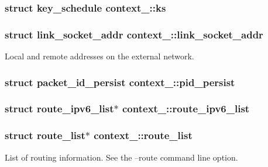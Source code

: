 \subsubsection[{ks}]{\setlength{\rightskip}{0pt plus 5cm}struct {\bf key\+\_\+schedule} context\+\_\+::ks}\label{structcontext__1_a2add75182e7da9d1d466d37c72e1c276}
\hypertarget{structcontext__1_a3f08fbd0447517dc9fefa3e1a30fa26f}{}
\subsubsection[{link\+\_\+socket\+\_\+addr}]{\setlength{\rightskip}{0pt plus 5cm}struct {\bf link\+\_\+socket\+\_\+addr} context\+\_\+::link\+\_\+socket\+\_\+addr}\label{structcontext__1_a3f08fbd0447517dc9fefa3e1a30fa26f}
Local and remote addresses on the external network. \hypertarget{structcontext__1_aa20a2b143b3a7f2db2cc9a1af3cdf3e2}{}
\subsubsection[{pid\+\_\+persist}]{\setlength{\rightskip}{0pt plus 5cm}struct {\bf packet\+\_\+id\+\_\+persist} context\+\_\+::pid\+\_\+persist}\label{structcontext__1_aa20a2b143b3a7f2db2cc9a1af3cdf3e2}
\hypertarget{structcontext__1_a987a02f5590d85e75031d36a6dc2fe5c}{}
\subsubsection[{route\+\_\+ipv6\+\_\+list}]{\setlength{\rightskip}{0pt plus 5cm}struct {\bf route\+\_\+ipv6\+\_\+list}$\ast$ context\+\_\+::route\+\_\+ipv6\+\_\+list}\label{structcontext__1_a987a02f5590d85e75031d36a6dc2fe5c}
\hypertarget{structcontext__1_a5fce2b35dc960bcdc0cab91b278048f7}{}
\subsubsection[{route\+\_\+list}]{\setlength{\rightskip}{0pt plus 5cm}struct {\bf route\+\_\+list}$\ast$ context\+\_\+::route\+\_\+list}\label{structcontext__1_a5fce2b35dc960bcdc0cab91b278048f7}
List of routing information. See the {\ttfamily --route} command line option. \hypertarget{structcontext__1_af266db9e924917e0dab9ca0f01259df1}{}
